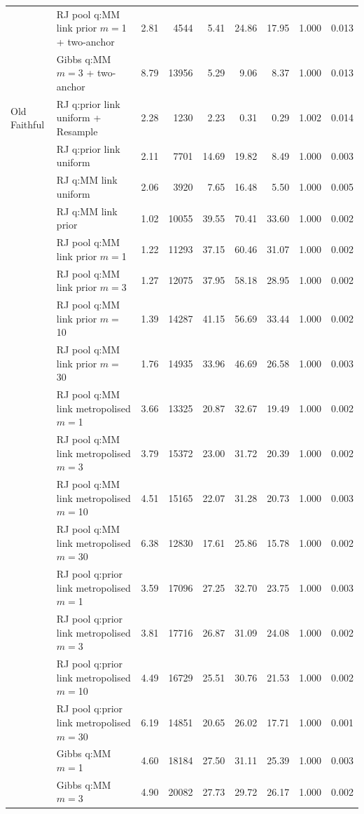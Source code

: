 \begin{tabular}{ll rrrrrrr}
 & RJ pool q:MM link prior $m=$1 + two-anchor & 2.81 & 4544 & 5.41 & 24.86 & 17.95 & 1.000 & 0.013 \\
 & Gibbs q:MM $m=$3 + two-anchor & 8.79 & 13956 & 5.29 & 9.06 & 8.37 & 1.000 & 0.013 \\
\addlinespace
Old Faithful & RJ q:prior link uniform + Resample & 2.28 & 1230 & 2.23 & 0.31 & 0.29 & 1.002 & 0.014 \\
 & RJ q:prior link uniform & 2.11 & 7701 & 14.69 & 19.82 & 8.49 & 1.000 & 0.003 \\
 & RJ q:MM link uniform & 2.06 & 3920 & 7.65 & 16.48 & 5.50 & 1.000 & 0.005 \\
 & RJ q:MM link prior & 1.02 & 10055 & 39.55 & 70.41 & 33.60 & 1.000 & 0.002 \\
 & RJ pool q:MM link prior $m=$1 & 1.22 & 11293 & 37.15 & 60.46 & 31.07 & 1.000 & 0.002 \\
 & RJ pool q:MM link prior $m=$3 & 1.27 & 12075 & 37.95 & 58.18 & 28.95 & 1.000 & 0.002 \\
 & RJ pool q:MM link prior $m=$10 & 1.39 & 14287 & 41.15 & 56.69 & 33.44 & 1.000 & 0.002 \\
 & RJ pool q:MM link prior $m=$30 & 1.76 & 14935 & 33.96 & 46.69 & 26.58 & 1.000 & 0.003 \\
 & RJ pool q:MM link metropolised $m=$1 & 3.66 & 13325 & 20.87 & 32.67 & 19.49 & 1.000 & 0.002 \\
 & RJ pool q:MM link metropolised $m=$3 & 3.79 & 15372 & 23.00 & 31.72 & 20.39 & 1.000 & 0.002 \\
 & RJ pool q:MM link metropolised $m=$10 & 4.51 & 15165 & 22.07 & 31.28 & 20.73 & 1.000 & 0.003 \\
 & RJ pool q:MM link metropolised $m=$30 & 6.38 & 12830 & 17.61 & 25.86 & 15.78 & 1.000 & 0.002 \\
 & RJ pool q:prior link metropolised $m=$1 & 3.59 & 17096 & 27.25 & 32.70 & 23.75 & 1.000 & 0.003 \\
 & RJ pool q:prior link metropolised $m=$3 & 3.81 & 17716 & 26.87 & 31.09 & 24.08 & 1.000 & 0.002 \\
 & RJ pool q:prior link metropolised $m=$10 & 4.49 & 16729 & 25.51 & 30.76 & 21.53 & 1.000 & 0.002 \\
 & RJ pool q:prior link metropolised $m=$30 & 6.19 & 14851 & 20.65 & 26.02 & 17.71 & 1.000 & 0.001 \\
 & Gibbs q:MM $m=$1 & 4.60 & 18184 & 27.50 & 31.11 & 25.39 & 1.000 & 0.003 \\
 & Gibbs q:MM $m=$3 & 4.90 & 20082 & 27.73 & 29.72 & 26.17 & 1.000 & 0.002 \\

\end{tabular}
